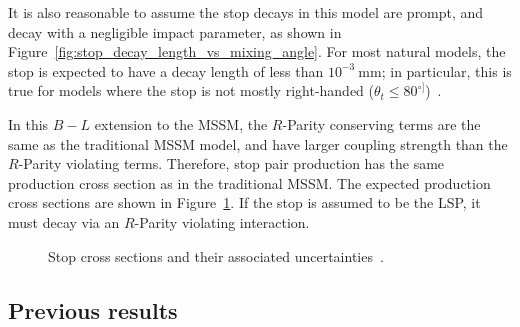 It is also reasonable to assume the stop decays in this model are prompt, and
decay with a negligible impact parameter, as shown in
Figure~\ref{fig:stop_decay_length_vs_mixing_angle}.
For most natural
models, the stop is expected to have a decay length of less than
$10^{-3}~\mathrm{mm}$;
in particular, this is true for models where the stop is not mostly
right-handed
($\theta_t \leq 80^{\circ]}$)~\cite{Marshall:2014cwa,Marshall:2014kea}.

In this $B-L$ extension to the MSSM, the $R$-Parity conserving terms are the
same as the traditional MSSM model, and have larger coupling strength than
the $R$-Parity violating terms.
Therefore, stop pair production has the same production cross section as in the
traditional MSSM.
The expected production cross sections are shown in Figure~\ref{fig:stop_xsec}.
If the stop is assumed to be the LSP, it must decay via an $R$-Parity
violating interaction.

\begin{figure}[th]
  \caption{
    Stop cross sections and their associated
    uncertainties~\cite{Beenakker:1997ut,Beenakker:2010nq,Beenakker:2011fu}.
  }
  \label{fig:stop_xsec}
\end{figure}

\FloatBarrier
\subsection{Previous results}

